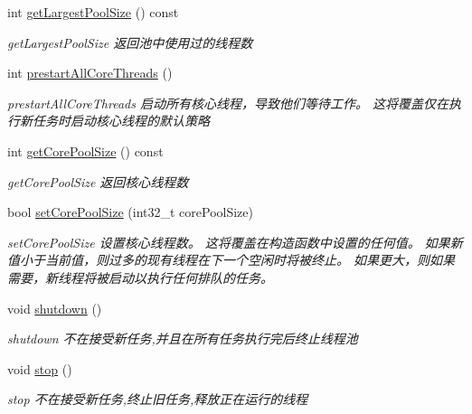\begin{DoxyCompactItemize}
int \hyperlink{classThreadPoolExecutor_a884aecf32f12775eb713aacef9ddded0}{get\+Largest\+Pool\+Size} () const
\begin{DoxyCompactList}\small\item\em get\+Largest\+Pool\+Size 返回池中使用过的线程数 \end{DoxyCompactList}\item 
int \hyperlink{classThreadPoolExecutor_ad7dd8949ce60dd7b835dae26ea4e7e88}{prestart\+All\+Core\+Threads} ()
\begin{DoxyCompactList}\small\item\em prestart\+All\+Core\+Threads 启动所有核心线程，导致他们等待工作。 这将覆盖仅在执行新任务时启动核心线程的默认策略 \end{DoxyCompactList}\item 
int \hyperlink{classThreadPoolExecutor_a9099318ba5cab5dd05f219babba4b6b7}{get\+Core\+Pool\+Size} () const
\begin{DoxyCompactList}\small\item\em get\+Core\+Pool\+Size 返回核心线程数 \end{DoxyCompactList}\item 
bool \hyperlink{classThreadPoolExecutor_aaada9deadf7c0f72bca5076deaa8c92f}{set\+Core\+Pool\+Size} (int32\+\_\+t core\+Pool\+Size)
\begin{DoxyCompactList}\small\item\em set\+Core\+Pool\+Size 设置核心线程数。 这将覆盖在构造函数中设置的任何值。 如果新值小于当前值，则过多的现有线程在下一个空闲时将被终止。 如果更大，则如果需要，新线程将被启动以执行任何排队的任务。 \end{DoxyCompactList}\item 
\mbox{\label{classThreadPoolExecutor_ad04796913a932a6e465696d7b2656e86}} 
void \hyperlink{classThreadPoolExecutor_ad04796913a932a6e465696d7b2656e86}{shutdown} ()
\begin{DoxyCompactList}\small\item\em shutdown 不在接受新任务,并且在所有任务执行完后终止线程池 \end{DoxyCompactList}\item 
\mbox{\label{classThreadPoolExecutor_acddd3730721069eca335e1529926f9d9}} 
void \hyperlink{classThreadPoolExecutor_acddd3730721069eca335e1529926f9d9}{stop} ()
\begin{DoxyCompactList}\small\item\em stop 不在接受新任务,终止旧任务,释放正在运行的线程 \end{DoxyCompactList}\item 

\end{DoxyCompactItemize}
